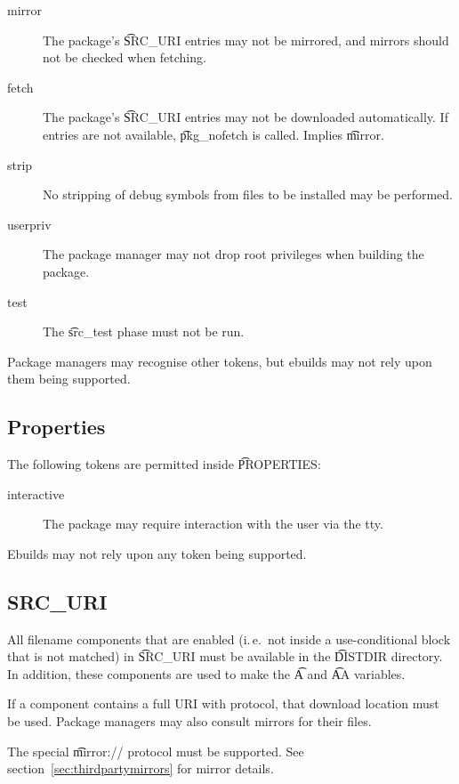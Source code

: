 \begin{description}
\item[mirror] The package's \t{SRC\_URI} entries may not be mirrored, and mirrors should not
    be checked when fetching.
\item[fetch] The package's \t{SRC\_URI} entries may not be downloaded automatically. If
    entries are not available, \t{pkg\_nofetch} is called. Implies \t{mirror}.
\item[strip] No stripping of debug symbols from files to be installed may be performed.
\item[userpriv] The package manager may not drop root privileges when building the package.
\item[test] The \t{src\_test} phase must not be run.
\end{description}

Package managers may recognise other tokens, but ebuilds may not rely upon them being supported.

\subsection{Properties}
\label{sec:properties}

The following tokens are permitted inside \t{PROPERTIES}:

\begin{description}
\item[interactive] The package may require interaction with the user via the tty.
\end{description}

Ebuilds may not rely upon any token being supported.

\subsection{SRC\_URI}
\label{sec:src-uri-behaviour}

All filename components that are enabled (i.\,e.\ not inside a use-conditional block that is not
matched) in \t{SRC\_URI} must be available in the \t{DISTDIR} directory. In addition, these
components are used to make the \t{A} and \t{AA} variables.

If a component contains a full URI with protocol, that download location must be used. Package
managers may also consult mirrors for their files.

The special \t{mirror://} protocol must be supported. See section~\ref{sec:thirdpartymirrors} for mirror
details.

